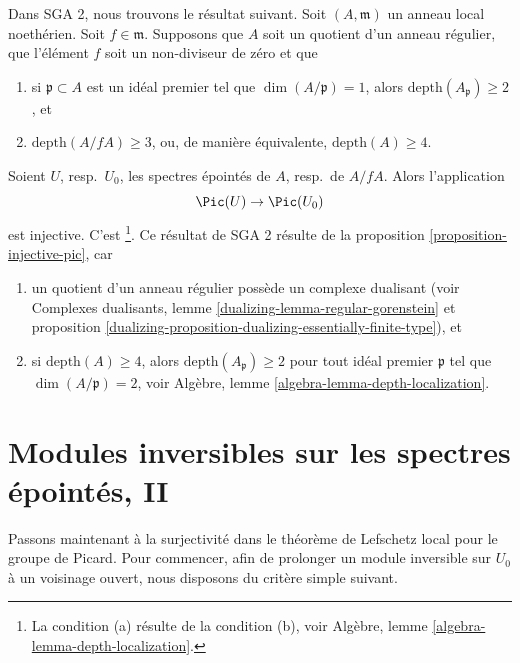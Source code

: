 \begin{remark}
\label{remark-compare-SGA2}
Dans SGA 2, nous trouvons le résultat suivant. Soit $(A, \mathfrak m)$ un
anneau local noethérien. Soit $f \in \mathfrak m$. Supposons que $A$
soit un quotient d'un anneau régulier, que l'élément
$f$ soit un non-diviseur de zéro et que
\begin{enumerate}
\item[(a)] si $\mathfrak p \subset A$ est un idéal premier tel que
$\dim(A/\mathfrak p) = 1$, alors $\text{depth}(A_\mathfrak p) \geq 2$, et
\item[(b)] $\text{depth}(A/fA) \geq 3$, ou, de manière équivalente,
$\text{depth}(A) \geq 4$.
\end{enumerate}
Soient $U$, resp.\ $U_0$, les spectres épointés de $A$, resp.\ de $A/fA$. Alors
l'application
$$
\Pic(U) \to \Pic(U_0)
$$
est injective. C'est \cite[Exposee XI, lemme 3.16]{SGA2}\footnote{La condition
(a) résulte de la condition (b), voir
Algèbre, lemme \ref{algebra-lemma-depth-localization}.}. Ce résultat
de SGA 2 résulte de la proposition \ref{proposition-injective-pic},
car
\begin{enumerate}
\item un quotient d'un anneau régulier possède un complexe dualisant (voir
Complexes dualisants, lemme \ref{dualizing-lemma-regular-gorenstein} et
proposition \ref{dualizing-proposition-dualizing-essentially-finite-type}), et
\item si $\text{depth}(A) \geq 4$, alors $\text{depth}(A_\mathfrak p) \geq 2$
pour tout idéal premier $\mathfrak p$ tel que $\dim(A/\mathfrak p) = 2$, voir
Algèbre, lemme \ref{algebra-lemma-depth-localization}.
\end{enumerate}
\end{remark}






\section{Modules inversibles sur les spectres épointés, II}
\label{section-local-lefschetz-for-pic-surjective}

\noindent
Passons maintenant à la surjectivité dans le théorème de Lefschetz local pour le groupe de Picard.
Pour commencer, afin de prolonger un module inversible sur $U_0$ à un voisinage ouvert,
nous disposons du critère simple suivant.

